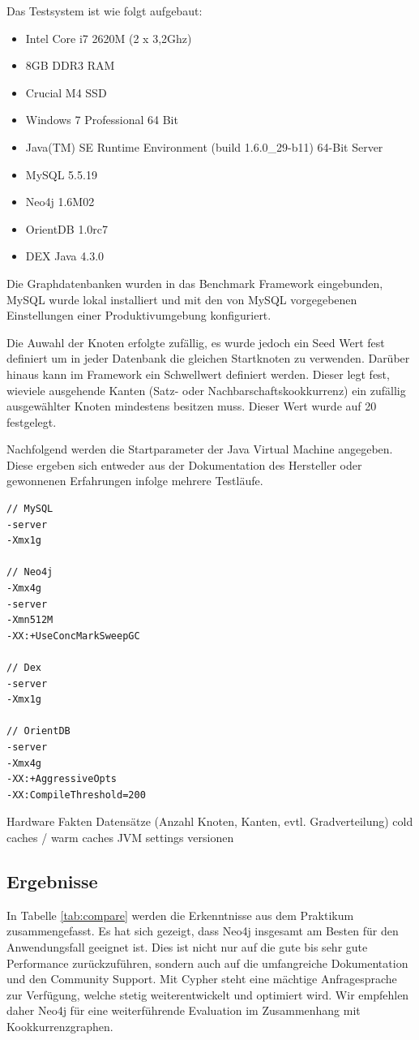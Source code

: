 \documentclass[11pt, a4paper, oneside]{article} %
\begin{document}
Das Testsystem ist wie folgt aufgebaut: 
\begin{itemize}
	\item Intel Core i7 2620M (2 x 3,2Ghz)
	\item 8GB DDR3 RAM
	\item Crucial M4 SSD
	\item Windows 7 Professional 64 Bit
	\item Java(TM) SE Runtime Environment (build 1.6.0\_{}29-b11) 64-Bit Server
	\item MySQL 5.5.19
	\item Neo4j 1.6M02
	\item OrientDB 1.0rc7
	\item DEX Java 4.3.0
\end{itemize}
Die Graphdatenbanken wurden in das Benchmark Framework eingebunden, MySQL wurde lokal installiert und mit den von MySQL vorgegebenen Einstellungen einer Produktivumgebung konfiguriert.
\par
Die Auwahl der Knoten erfolgte zufällig, es wurde jedoch ein Seed Wert fest definiert um in jeder Datenbank die gleichen Startknoten zu verwenden. Darüber hinaus kann im Framework ein Schwellwert definiert werden. Dieser legt fest, wieviele ausgehende Kanten (Satz- oder Nachbarschaftskookkurrenz) ein zufällig ausgewählter Knoten mindestens besitzen muss. Dieser Wert wurde auf 20 festgelegt.
\par
Nachfolgend werden die Startparameter der Java Virtual Machine angegeben. Diese ergeben sich entweder aus der Dokumentation des Hersteller oder gewonnenen Erfahrungen infolge mehrere Testläufe.

\begin{lstlisting}
// MySQL
-server
-Xmx1g

// Neo4j
-Xmx4g
-server
-Xmn512M
-XX:+UseConcMarkSweepGC

// Dex
-server
-Xmx1g

// OrientDB
-server
-Xmx4g
-XX:+AggressiveOpts 
-XX:CompileThreshold=200
\end{lstlisting}


Hardware Fakten
Datensätze (Anzahl Knoten, Kanten, evtl. Gradverteilung)
cold caches / warm caches
JVM settings
versionen

\subsection{Ergebnisse}

In Tabelle \ref{tab:compare} werden die Erkenntnisse aus dem Praktikum zusammengefasst. Es hat sich gezeigt, dass Neo4j insgesamt am Besten für den Anwendungsfall geeignet ist. Dies ist nicht nur auf die gute bis sehr gute Performance zurückzuführen, sondern auch auf die umfangreiche Dokumentation und den Community Support. Mit Cypher steht eine mächtige Anfragesprache zur Verfügung, welche stetig weiterentwickelt und optimiert wird. Wir empfehlen daher Neo4j für eine weiterführende Evaluation im Zusammenhang mit Kookkurrenzgraphen.
\end{document}
